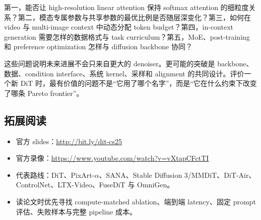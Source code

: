 第一，能否让 high-resolution linear attention 保持 softmax attention 的细粒度关系？第二，模态专属参数与共享参数的最优比例是否随层深变化？第三，如何在 video 与 multi-image context 中动态分配 token budget？第四，in-context generation 需要怎样的数据格式与 task curriculum？第五，MoE、post-training 和 preference optimization 怎样与 diffusion backbone 协同？

这些问题说明未来进展不会只来自更大的 denoiser。更可能的突破是 backbone、数据、condition interface、系统 kernel、采样和 alignment 的共同设计。评价一个新 DiT 时，最有价值的问题不是“它用了哪个名字”，而是“它在什么约束下改变了哪条 Pareto frontier”。

\subsection{拓展阅读}

\begin{itemize}[itemsep=0.2em,topsep=0.2em]
  \item 官方 slides：\url{http://bit.ly/dit-cs25}
  \item 官方录像：\url{https://www.youtube.com/watch?v=vXtapCFctTI}
  \item 代表路线：DiT、PixArt-$\alpha$、SANA、Stable Diffusion 3/MMDiT、DiT-Air、ControlNet、LTX-Video、FuseDiT 与 OmniGen。
  \item 读论文时优先寻找 compute-matched ablation、端到端 latency、固定 prompt 评估、失败样本与完整 pipeline 成本。
\end{itemize}


